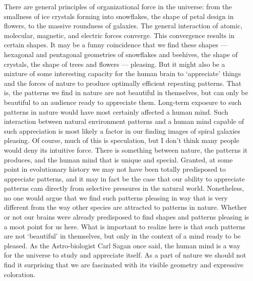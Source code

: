 \documentclass[11pt]{book}%
\theoremstyle{plain}
\numberwithin{equation}{section}
\theoremstyle{definition}
\newtheorem{phrase string}{Phrase String}
\begin{document}
There are general principles of organizational force in the universe: from the smallness of ice crystals forming into snowflakes, the shape of petal design in flowers, to the massive roundness of galaxies. The general interaction of atomic, molecular, magnetic, and electric forces converge. This convergence results in certain shapes. It may be a funny coincidence that we find these shapes --- hexagonal and pentagonal geometries of snowflakes and beehives, the shape of crystals, the shape of trees and flowers --- pleasing. But it might also be a mixture of some interesting capacity for the human brain to `appreciate' things and the forces of nature to produce optimally efficient repeating patterns. That is, the patterns we find in nature are not beautiful in themselves, but can only be beautiful to an audience ready to appreciate them. Long-term exposure to such patterns in nature would have most certainly affected a human mind. Such interaction between natural environment patterns and a human mind capable of such appreciation is most likely a factor in our finding images of spiral galaxies pleasing. Of course, much of this is speculation, but I don't think many people would deny its intuitive force. There is something between nature, the patterns it produces, and the human mind that is unique and special. Granted, at some point in evolutionary history we may not have been totally predisposed to appreciate patterns, and it may in fact be the case that our ability to appreciate patterns cam directly from selective pressures in the natural world. Nonetheless, no one would argue that we find such patterns pleasing in way that is very different from the way other species are attracted to patterns in nature. Whether or not our brains were already predisposed to find shapes and patterns pleasing is a moot point for us here. What is important to realize here is that such patterns are not `beautiful' in themselves, but only in the context of a mind ready to be pleased. As the Astro-biologist Carl Sagan once said, the human mind is a way for the universe to study and appreciate itself. As a part of nature we should not find it surprising that we are fascinated with its visible geometry and expressive coloration. 
\end{document}
